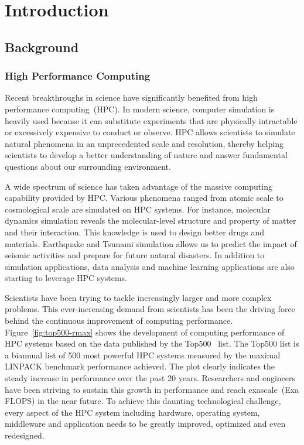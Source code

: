 \chapter{Introduction}\label{sec:i}

\section{Background}\label{sec:i-background}

\subsection{High Performance Computing}

Recent breakthroughs in science have significantly benefited from high
performance computing~(HPC). In modern science, computer simulation is heavily
used because it can substitute experiments that are physically intractable
or excessively expensive to conduct or observe. HPC allows scientists to
simulate natural phenomena in an unprecedented scale and resolution, thereby
helping scientists to develop a better understanding of nature and answer
fundamental questions about our surrounding environment.

A wide spectrum of science has taken advantage of the massive computing
capability provided by HPC\@. Various phenomena ranged from atomic scale to
cosmological scale are simulated on HPC systems. For instance, molecular
dynamics simulation reveals the molecular-level structure and property of
matter and their interaction. This knowledge is used to design better drugs
and materials. Earthquake and Tsunami simulation allows us to predict the
impact of seismic activities and prepare for future natural disasters. In
addition to simulation applications, data analysis and machine learning
applications are also starting to leverage HPC systems.

Scientists have been trying to tackle increasingly larger and more complex
problems. This ever-increasing demand from scientists has been the driving
force behind the continuous improvement of computing performance.
Figure~\ref{fig:top500-rmax} shows the development of computing performance of
HPC systems based on the data published by the Top500~\autocite{top500} list.
The Top500 list is a biannual list of 500 most powerful HPC systems measured
by the maximal LINPACK benchmark performance achieved. The plot clearly
indicates the steady increase in performance over the past 20 years.
Researchers and engineers have been striving to sustain this growth in
performance and reach exascale~(Exa FLOPS) in the near future. To achieve this
daunting technological challenge, every aspect of the HPC system including
hardware, operating system, middleware and application needs to be greatly
improved, optimized and even redesigned.


